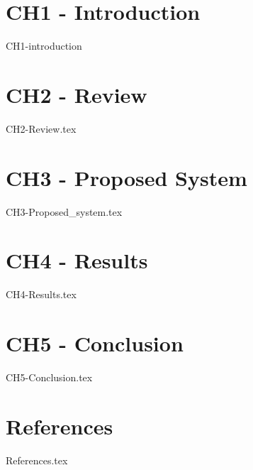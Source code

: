 \documentclass[a4paper]{book}
\begin{document}
	\tableofcontents
	\chapter{CH1 - Introduction}
	{CH1-introduction}
	
	\chapter{CH2 - Review}
	{CH2-Review.tex}
	
	\chapter{CH3 - Proposed System}
	{CH3-Proposed_system.tex}
	
	\chapter{CH4 - Results}
	{CH4-Results.tex}
	
	\chapter{CH5 - Conclusion}
	{CH5-Conclusion.tex}
	
	\chapter{References}
	{References.tex}
	
\end{document}
